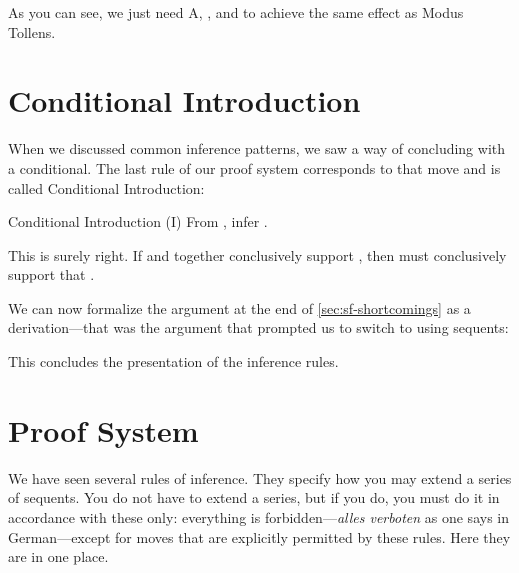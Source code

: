 As you can see, we just need A, \condE, and \negI{} to achieve the same effect 
as Modus Tollens.

\section{Conditional Introduction}

When we discussed common inference patterns, we saw a way of concluding with a 
conditional. The last rule of our proof system corresponds to that move and is 
called Conditional Introduction: 


\begin{infrule}
 \item[Conditional Introduction (\p{\limplies}I)] From , infer .
\end{infrule}

This is surely right. If \p{\Lambda} and  together conclusively support 
, then  \p{\Lambda} must conclusively support that .

We can now formalize the argument at the end of                          
\ref{sec:sf-shortcomings}  as a derivation---that was the argument that prompted 
us to switch to using sequents:

\begin{argumentN}[1]







\end{argumentN}


This concludes the presentation of the inference rules.

\section{Proof System}\label{sec:SL-complete}

We have seen several rules of inference. They specify how you may extend a 
series of sequents. You do not have to extend a series, but if you do, you must 
do it in accordance with these only: everything is forbidden---\emph{alles 
verboten} as one says in German---except for moves that are explicitly permitted 
by these rules.  Here they are in one place. 

